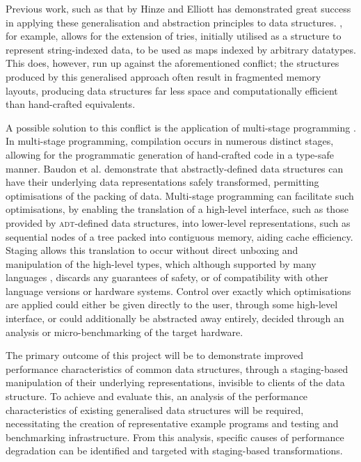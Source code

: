 \documentclass[11pt]{article}
\begin{document}
Previous work, such as that by Hinze \cite{hinze} and Elliott \cite{elliott} has demonstrated great success in applying these generalisation and abstraction principles to data structures. \cite{hinze}, for example, allows for the extension of tries, initially utilised \cite{tries} as a structure to represent string-indexed data, to be used as maps indexed by arbitrary datatypes. This does, however, run up against the aforementioned conflict; the structures produced by this generalised approach often result in fragmented memory layouts, producing data structures far less space and computationally efficient than hand-crafted equivalents.

A possible solution to this conflict is the application of multi-stage programming \cite{msp}. In multi-stage programming, compilation occurs in numerous distinct stages, allowing for the programmatic generation of hand-crafted code in a type-safe manner. Baudon et al. \cite{bitstealing} demonstrate that abstractly-defined data structures can have their underlying data representations safely transformed, permitting optimisations of the packing of data. Multi-stage programming can facilitate such optimisations, by enabling the translation of a high-level interface, such as those provided by \textsc{adt}-defined data structures, into lower-level representations, such as sequential nodes of a tree packed into contiguous memory, aiding cache efficiency. Staging allows this translation to occur without direct unboxing and manipulation of the high-level types, which although supported by many languages \cite{unboxedtypes}, discards any guarantees of safety, or of compatibility with other language versions or hardware systems. Control over exactly which optimisations are applied could either be given directly to the user, through some high-level interface, or could additionally be abstracted away entirely, decided through an analysis or micro-benchmarking of the target hardware.

The primary outcome of this project will be to demonstrate improved performance characteristics of common data structures, through a staging-based manipulation of their underlying representations, invisible to clients of the data structure. To achieve and evaluate this, an analysis of the performance characteristics of existing generalised data structures will be required, necessitating the creation of representative example programs and testing and benchmarking infrastructure. From this analysis, specific causes of performance degradation can be identified and targeted with staging-based transformations.
\end{document}
